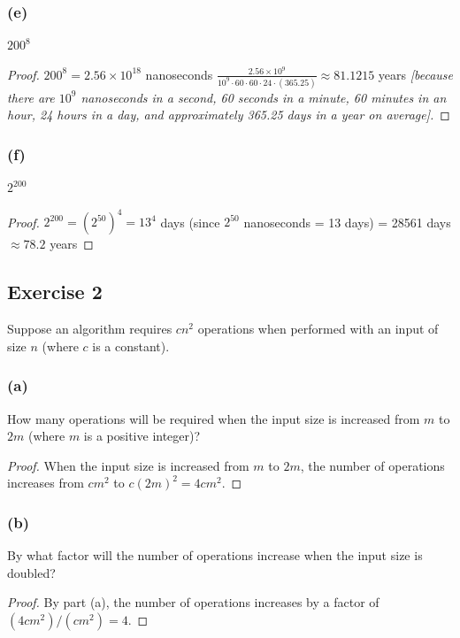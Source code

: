 \documentclass[14pt]{extarticle}
\begin{document}
\subsubsection{(e)}
\(200^8\)
\begin{proof}
    \(200^8 = 2.56 \times 10^{18}\) nanoseconds \(\frac{2.56 \times 10^9}{10^9 \cdot 60 \cdot 60 \cdot 24 \cdot (365.25)}
    \approx 81.1215\) years {\it [because there are \(10^9\) nanoseconds in a second, 60 seconds in a minute, 60 minutes in
                an hour, 24 hours in a day, and approximately 365.25 days in a year on average].}
\end{proof}

\subsubsection{(f)}
\(2^{200}\)
\begin{proof}
    \(2^{200} = (2^{50})^4 = 13^4\) days (since \(2^{50}\) nanoseconds = 13 days) = 28561 days \(\approx 78.2\) years
\end{proof}

\subsection{Exercise 2}
Suppose an algorithm requires \(cn^2\) operations when performed with an input of size \(n\) (where \(c\) is a
constant).

\subsubsection{(a)}
How many operations will be required when the input size is increased from \(m\) to \(2m\) (where \(m\) is a positive
integer)?

\begin{proof}
    When the input size is increased from \(m\) to \(2m\), the number of operations increases from \(cm^2\) to
    \(c(2m)^2 = 4cm^2\).
\end{proof}

\subsubsection{(b)}
By what factor will the number of operations increase when the input size is doubled?

\begin{proof}
    By part (a), the number of operations increases by a factor of \((4cm^2)/(cm^2) = 4\).
\end{proof}
\end{document}
